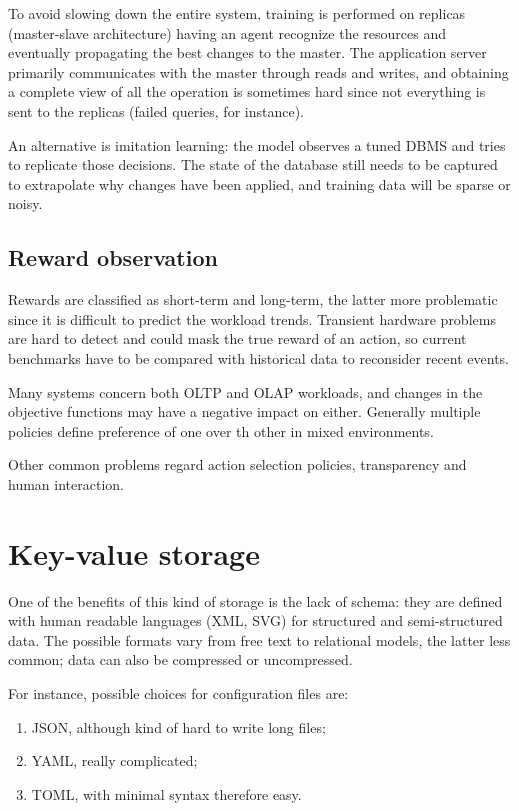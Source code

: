 To avoid slowing down the entire system, training is performed on replicas (master-slave architecture) having an agent recognize the resources and eventually propagating the best changes to the master. The application server primarily communicates with the master through reads and writes, and obtaining a complete view of all the operation is sometimes hard since not everything is sent to the replicas (failed queries, for instance). 

An alternative is imitation learning: the model observes a tuned DBMS and tries to replicate those decisions. The state of the database still needs to be captured to extrapolate why changes have been applied, and training data will be sparse or noisy.

\subsection{Reward observation}
Rewards are classified as short-term and long-term, the latter more problematic since it is difficult to predict the workload trends. Transient hardware problems are hard to detect and could mask the true reward of an action, so current benchmarks have to be compared with historical data to reconsider recent events. 

Many systems concern both OLTP and OLAP workloads, and changes in the objective functions may have a negative impact on either. Generally multiple policies define preference of one over th other in mixed environments. 

Other common problems regard action selection policies, transparency and human interaction. 


\section{Key-value storage}
One of the benefits of this kind of storage is the lack of schema: they are defined with human readable languages (XML, SVG) for structured and semi-structured data. The possible formats vary from free text to relational models, the latter less common; data can also be compressed or uncompressed. 

For instance, possible choices for configuration files are:
\begin{enumerate}
	\item JSON, although kind of hard to write long files;
	\item YAML, really complicated;
	\item TOML, with minimal syntax therefore easy.
\end{enumerate}

